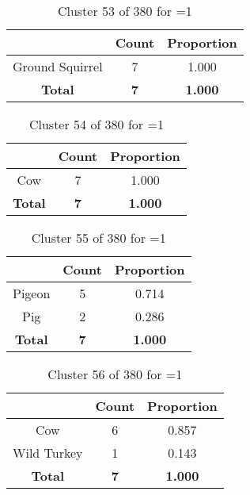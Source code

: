 \begin{table}[ht!]
\centering
\begin{tabular}{|c|c|c|}
\hline
\bf \Spec{} &\bf Count &\bf Proportion\\ \hline \hline
Ground Squirrel & 7 & 1.000\\ \hline
\hline
\bf Total & \bf 7 & \bf 1.000\\ \hline
\end{tabular}
\label{tab:cluster:53:1}
\caption{Cluster 53 of 380 for \minneigh{}=1}
\end{table}

\begin{table}[ht!]
\centering
\begin{tabular}{|c|c|c|}
\hline
\bf \Spec{} &\bf Count &\bf Proportion\\ \hline \hline
Cow & 7 & 1.000\\ \hline
\hline
\bf Total & \bf 7 & \bf 1.000\\ \hline
\end{tabular}
\label{tab:cluster:54:1}
\caption{Cluster 54 of 380 for \minneigh{}=1}
\end{table}

\begin{table}[ht!]
\centering
\begin{tabular}{|c|c|c|}
\hline
\bf \Spec{} &\bf Count &\bf Proportion\\ \hline \hline
Pigeon & 5 & 0.714\\ \hline
Pig & 2 & 0.286\\ \hline
\hline
\bf Total & \bf 7 & \bf 1.000\\ \hline
\end{tabular}
\label{tab:cluster:55:1}
\caption{Cluster 55 of 380 for \minneigh{}=1}
\end{table}

\begin{table}[ht!]
\centering
\begin{tabular}{|c|c|c|}
\hline
\bf \Spec{} &\bf Count &\bf Proportion\\ \hline \hline
Cow & 6 & 0.857\\ \hline
Wild Turkey & 1 & 0.143\\ \hline
\hline
\bf Total & \bf 7 & \bf 1.000\\ \hline
\end{tabular}
\label{tab:cluster:56:1}
\caption{Cluster 56 of 380 for \minneigh{}=1}
\end{table}

